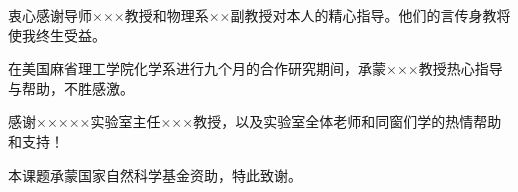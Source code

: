 
\begin{acknowledgements}

  衷心感谢导师×××教授和物理系××副教授对本人的精心指导。他们的言传身教将使我终生受益。

  在美国麻省理工学院化学系进行九个月的合作研究期间，承蒙×××教授热心指导与帮助，不胜感激。

  感谢×××××实验室主任×××教授，以及实验室全体老师和同窗们学的热情帮助和支持！

  本课题承蒙国家自然科学基金资助，特此致谢。

\end{acknowledgements}
